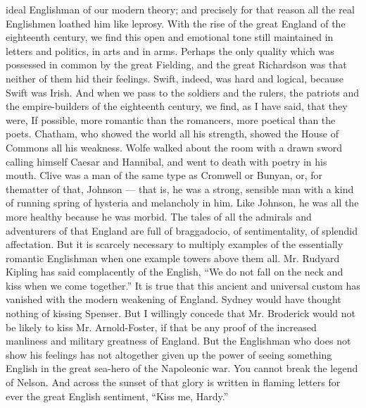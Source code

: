 ideal Englishman of our modern theory; and precisely for that reason all the real Englishmen loathed him like leprosy. With the rise of the great England of the eighteenth century, we find this open and emotional tone still maintained in letters and politics, in arts and in arms. Perhaps the only quality which was possessed in common by the great Fielding, and the great Richardson was that neither of them hid their feelings. Swift, indeed, was hard and logical, because Swift was Irish. And when we pass to the soldiers and the rulers, the patriots and the empire-builders of the eighteenth century, we find, as I have said, that they were, If possible, more romantic than the romancers, more poetical than the poets. Chatham, who showed the world all his strength, showed the House of Commons all his weakness. Wolfe walked about the room with a drawn sword calling himself Caesar and Hannibal, and went to death with poetry in his mouth. Clive was a man of the same type as Cromwell or Bunyan, or, for thematter of that, Johnson — that is, he was a strong, sensible man with a kind of running spring of hysteria and melancholy in him. Like Johnson, he was all the more healthy because he was morbid. The tales of all the admirals and adventurers of that England are full of braggadocio, of sentimentality, of splendid affectation. But it is scarcely necessary to multiply examples of the essentially romantic Englishman when one example towers above them all. Mr. Rudyard Kipling has said complacently of the English, “We do not fall on the neck and kiss when we come together.” It is true that this ancient and universal custom has vanished with the modern weakening of England. Sydney would have thought nothing of kissing Spenser. But I willingly concede that Mr. Broderick would not be likely to kiss Mr. Arnold-Foster, if that be any proof of the increased manliness and military greatness of England. But the Englishman who does not show his feelings has not altogether given up the power of seeing something English in the great sea-hero of the Napoleonic war. You cannot break the legend of Nelson. And across the sunset of that glory is written in flaming letters for ever the great English sentiment, “Kiss me, Hardy.”

